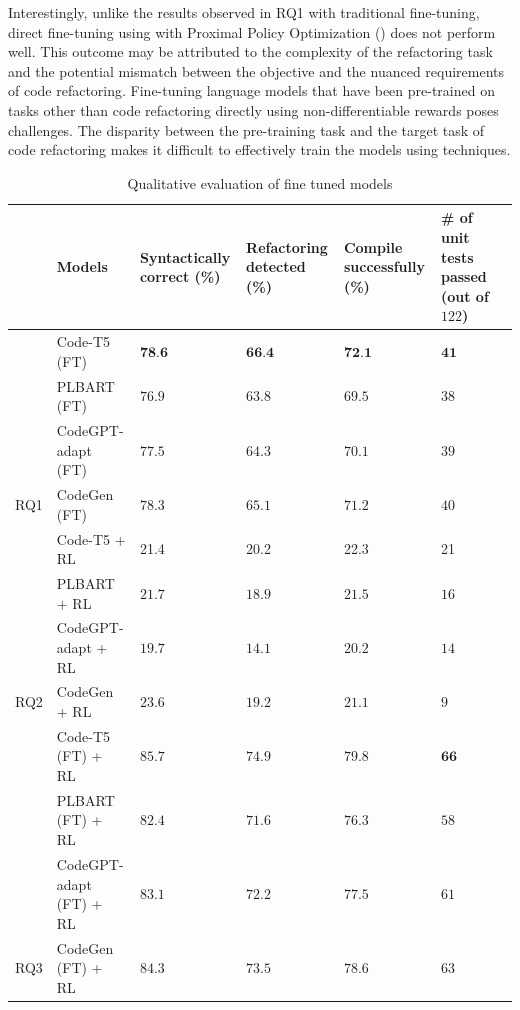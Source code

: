 Interestingly, unlike the results observed in RQ1 with traditional fine-tuning, direct fine-tuning using \rl{} with Proximal Policy Optimization (\ppo{}) does not perform well.
This outcome may be attributed to the complexity of the \exm{} refactoring task and the potential mismatch between the \rl{} objective and the nuanced requirements of code refactoring. Fine-tuning language models that have been pre-trained on tasks other than code refactoring directly using non-differentiable rewards poses challenges. The disparity between the pre-training task and the target task of code refactoring makes it difficult to effectively train the models using \rl{} techniques. 

\begin{table}[ht!]
\centering
\caption{Qualitative evaluation of fine tuned models}
\label{tab:exresults}
\begin{tabular}{p{1cm}p{4cm}|%
>{\raggedleft\arraybackslash}p{2.5cm}%
>{\raggedleft\arraybackslash}p{2cm}%
>{\raggedleft\arraybackslash}p{2cm}%
>{\raggedleft\arraybackslash}p{2cm}%
>{\raggedleft\arraybackslash}p{2cm}%
}
&\textbf{Models} & \textbf{Syntactically correct (\%)}  & \textbf{Refactoring detected (\%)} & \textbf{Compile successfully (\%)} & \textbf{\# of unit tests passed (out of $122$)} \\ \midrule
&Code-T5 (FT) & $ \textbf{78.6} $  & $\textbf{66.4}$ & $\textbf{72.1}$ & $\textbf{41}$ \\
&PLBART (FT) & $76.9$ & $63.8$ & $69.5$ & $38$ \\
&CodeGPT-adapt (FT) & ${77.5}$ & ${64.3}$ & ${70.1}$ & $39$ \\
\multirow{-4}{*}{RQ1}&CodeGen (FT) & $78.3$ & ${65.1}$ & $71.2$ & $40$ \\ \midrule
&Code-T5 + RL & {21.4}  & {20.2} & {22.3} & {21} \\
&PLBART + RL & ${21.7}$ & ${18.9}$ & ${21.5}$ & ${16}$ \\
&CodeGPT-adapt + RL& ${19.7}$ & ${14.1}$ & ${20.2}$ & $14$ \\
\multirow{-4}{*}{RQ2}&CodeGen + RL & $23.6$ & ${19.2}$ & $21.1$ & $9$ \\ 
\midrule
&Code-T5 (FT) + RL & $\mathbf{85.7}$  & $\mathbf{74.9}$ & $\mathbf{79.8}$ & $\mathbf{66}$ \\
&PLBART  (FT) + RL & ${82.4}$ & ${71.6}$ & ${76.3}$ & ${58}$ \\
&CodeGPT-adapt  (FT) + RL& ${83.1}$ & ${72.2}$ & ${77.5}$ & $61$ \\
\multirow{-4}{*}{RQ3}&CodeGen  (FT) + RL & $84.3$ & ${73.5}$ & $78.6$ & $63$ \\ \bottomrule

\end{tabular}
\end{table}


